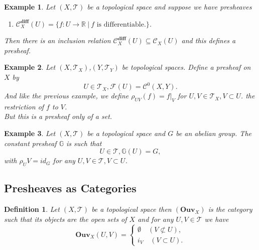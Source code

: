 \documentclass{article}
\newtheorem{definition}{Definition}[section]
\newtheorem{example}{Example}[section]
\numberwithin{equation}{section}
\begin{document}
\begin{example}
Let $(X,\mathcal{T})$ be a topological space and suppose we have presheaves 
\begin{enumerate}[\textbullet]
\item $\mathcal{C}^{\textbf{diff}}_X(U) = \{f:U\to\mathbb{R}\:|\: f\text{ is differentiable.}\}$.
\end{enumerate}
Then there is an inclusion relation $\mathcal{C}^{\textbf{diff}}_X(U)\subseteq\mathcal{C}_X(U)$ and this defines a presheaf.
\end{example}

\begin{example}
Let $(X,\mathcal{T}_X)$,$(Y,\mathcal{T}_Y)$ be topological spaces. Define a presheaf on $X$ by 
\begin{equation*}
U\in\mathcal{T}_X, \mathcal{F}(U) = \mathcal{C}^0(X,Y).
\end{equation*}
And like the previous example, we define $\rho_{UV}(f) = f|_V$ for $U,V\in\mathcal{T}_X, V\subset U$. the restriction of $f$ to $V$. \\
But this is a presheaf only of a set. 
\end{example}

\begin{example}
Let $(X,\mathcal{T})$ be a topological space and $G$ be an abelian group. The constant presheaf $\mathbb{G}$ is such that 
\begin{equation*}
U\in\mathcal{T}, \mathbb{G}(U) = G,
\end{equation*}
with $\rho_UV=id_G$ for any $U,V\in\mathcal{T},V\subset U$. 
\end{example}

\subsection{Presheaves as Categories}

\begin{definition}
Let $(X,\mathcal{T})$ be a topological space then $(\mathbf{Ouv}_X)$ is the category such that its objects are the open sets of $X$ and for any $U,V\in\mathcal{T}$ we have
\begin{equation*}
\mathbf{Ouv}_X(U,V)=
\begin{cases}
\emptyset \quad (V\not\subset U),\\
i_V \quad (V\subset U).
\end{cases}
\end{equation*}
\end{definition}
\end{document}
